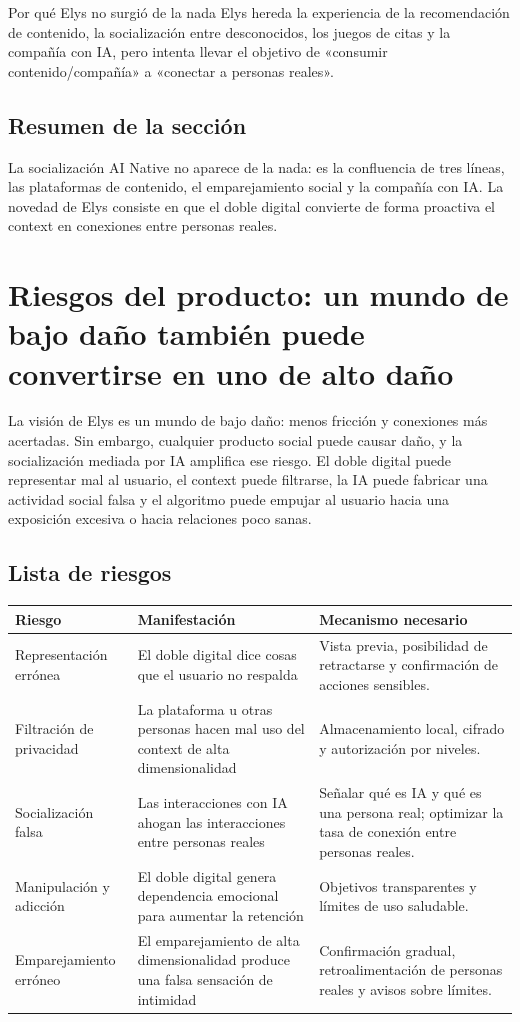 \documentclass[a4paper]{article}
\begin{document}
\begin{knowledgebox}{Por qué Elys no surgió de la nada}
Elys hereda la experiencia de la recomendación de contenido, la socialización entre desconocidos, los juegos de citas y la compañía con IA, pero intenta llevar el objetivo de «consumir contenido/compañía» a «conectar a personas reales».
\end{knowledgebox}

\subsection{Resumen de la sección}

La socialización AI Native no aparece de la nada: es la confluencia de tres líneas, las plataformas de contenido, el emparejamiento social y la compañía con IA. La novedad de Elys consiste en que el doble digital convierte de forma proactiva el context en conexiones entre personas reales.
\section{Riesgos del producto: un mundo de bajo daño también puede convertirse en uno de alto daño}

La visión de Elys es un mundo de bajo daño: menos fricción y conexiones más acertadas. Sin embargo, cualquier producto social puede causar daño, y la socialización mediada por IA amplifica ese riesgo. El doble digital puede representar mal al usuario, el context puede filtrarse, la IA puede fabricar una actividad social falsa y el algoritmo puede empujar al usuario hacia una exposición excesiva o hacia relaciones poco sanas.

\subsection{Lista de riesgos}

\noindent\begin{tabularx}{\textwidth}{p{}p{}X}
\toprule
Riesgo & Manifestación & Mecanismo necesario \\
\midrule
Representación errónea & El doble digital dice cosas que el usuario no respalda & Vista previa, posibilidad de retractarse y confirmación de acciones sensibles. \\
Filtración de privacidad & La plataforma u otras personas hacen mal uso del context de alta dimensionalidad & Almacenamiento local, cifrado y autorización por niveles. \\
Socialización falsa & Las interacciones con IA ahogan las interacciones entre personas reales & Señalar qué es IA y qué es una persona real; optimizar la tasa de conexión entre personas reales. \\
Manipulación y adicción & El doble digital genera dependencia emocional para aumentar la retención & Objetivos transparentes y límites de uso saludable. \\
Emparejamiento erróneo & El emparejamiento de alta dimensionalidad produce una falsa sensación de intimidad & Confirmación gradual, retroalimentación de personas reales y avisos sobre límites. \\
\bottomrule
\end{tabularx}
\end{document}
